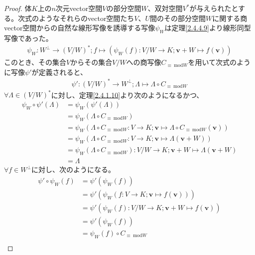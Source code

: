 \documentclass[dvipdfmx]{jsarticle}
\begin{document}
\begin{proof}
体$K$上の$n$次元vector空間$V$の部分空間$W$、双対空間$V^{*}$が与えられたとする。次式のようなそれらのvector空間たち$V$、$U$間のその部分空間$W$に関する商vector空間からの自然な線形写像を誘導する写像$\psi_{W}$は定理\ref{2.4.4.9}より線形同型写像であった。
\begin{align*}
\psi_{W}:W^{\bot} \rightarrow \left( {V}/{W} \right)^{*};f \mapsto \left( \psi_{W}(f):{V}/{W} \rightarrow K;\mathbf{v} + W \mapsto f\left( \mathbf{v} \right) \right)
\end{align*}
このとき、その集合$V$からその集合${V}/{W}$への商写像$C_{\equiv \ \mathrm{mod}W}$を用いて次式のように写像$\psi'$が定義されると、
\begin{align*}
\psi':\left( {V}/{W} \right)^{*} \rightarrow W^{\bot};\varLambda \mapsto \varLambda \circ C_{\equiv \ \mathrm{mod}W}
\end{align*}
$\forall\varLambda \in \left( {V}/{W} \right)^{*}$に対し、定理\ref{2.4.1.10}より次のようになるかつ、
\begin{align*}
\psi_{W} \circ \psi'(\varLambda) &= \psi_{W}\left( \psi'(\varLambda) \right)\\
&= \psi_{W}\left( \varLambda \circ C_{\equiv \ \mathrm{mod}W} \right)\\
&= \psi_{W}\left( \varLambda \circ C_{\equiv \ \mathrm{mod}W}:V \rightarrow K;\mathbf{v} \mapsto \varLambda \circ C_{\equiv \ \mathrm{mod}W}\left( \mathbf{v} \right) \right)\\
&= \psi_{W}\left( \varLambda \circ C_{\equiv \ \mathrm{mod}W}:V \rightarrow K;\mathbf{v} \mapsto \varLambda\left( \mathbf{v} + W \right) \right)\\
&= \psi_{W}\left( \varLambda \circ C_{\equiv \ \mathrm{mod}W} \right):{V}/{W} \rightarrow K;\mathbf{v} + W \mapsto \varLambda\left( \mathbf{v} + W \right)\\
&= \varLambda
\end{align*}
$\forall f \in W^{\bot}$に対し、次のようになる。
\begin{align*}
\psi' \circ \psi_{W}(f) &= \psi'\left( \psi_{W}(f) \right)\\
&= \psi'\left( \psi_{W}\left( f:V \rightarrow K;\mathbf{v} \mapsto f\left( \mathbf{v} \right) \right) \right)\\
&= \psi'\left( \psi_{W}(f):{V}/{W} \rightarrow K;\mathbf{v} + W \mapsto f\left( \mathbf{v} \right) \right)\\
&= \psi'\left( \psi_{W}(f) \right)\\
&= \psi_{W}(f) \circ C_{\equiv \ \mathrm{mod}W}\\

\end{align*}
\end{proof}
\end{document}
